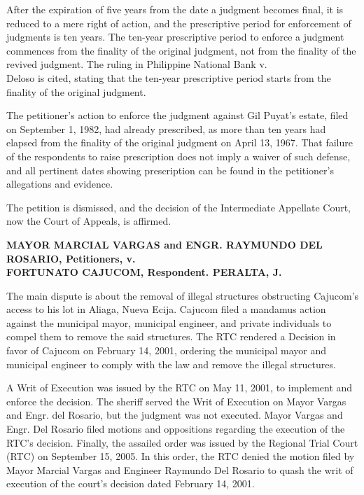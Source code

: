 \documentclass[
12pt,
oneside,
onehalfspacing,
headsepline
]{DigestCollection}
\begin{document}
After the expiration of five years from the date a judgment becomes final, it is reduced to a mere right of action, and the prescriptive period for enforcement of judgments is ten years. The ten-year prescriptive period to enforce a judgment commences from the finality of the original judgment, not from the finality of the revived judgment. The ruling in Philippine National Bank v. \\Deloso is cited, stating that the ten-year prescriptive period starts from the finality of the original judgment.

The petitioner's action to enforce the judgment against Gil Puyat's estate, filed on September 1, 1982, had already prescribed, as more than ten years had elapsed from the finality of the original judgment on April 13, 1967. That failure of the respondents to raise prescription does not imply a waiver of such defense, and all pertinent dates showing prescription can be found in the petitioner's allegations and evidence.

The petition is dismissed, and the decision of the Intermediate Appellate Court, now the Court of Appeals, is affirmed.

\label{d7fce4f0-0a19-11ef-932c-63c852f65e48}


\noindent\textbf{MAYOR MARCIAL VARGAS and ENGR. RAYMUNDO DEL ROSARIO, Petitioners, v. \\FORTUNATO CAJUCOM, Respondent. PERALTA, J.}\vspace{0.4cm}

The main dispute is about the removal of illegal structures obstructing Cajucom's access to his lot in Aliaga, Nueva Ecija. Cajucom filed a mandamus action against the municipal mayor, municipal engineer, and private individuals to compel them to remove the said structures. The RTC rendered a Decision in favor of Cajucom on February 14, 2001, ordering the municipal mayor and municipal engineer to comply with the law and remove the illegal structures.

A Writ of Execution was issued by the RTC on May 11, 2001, to implement and enforce the decision. The sheriff served the Writ of Execution on Mayor Vargas and Engr. del Rosario, but the judgment was not executed. Mayor Vargas and Engr. Del Rosario filed motions and oppositions regarding the execution of the RTC's decision. Finally, the assailed order was issued by the Regional Trial Court (RTC) on September 15, 2005. In this order, the RTC denied the motion filed by Mayor Marcial Vargas and Engineer Raymundo Del Rosario to quash the writ of execution of the court's decision dated February 14, 2001. 
\end{document}
